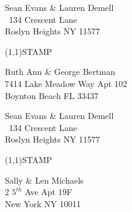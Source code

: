 \documentclass[12pt]{article}
\begin{document}
\begin{minipage}{.5\linewidth} \noindent
Sean Evans \& Lauren Demell\\\ 
134 Crescent Lane\\ 
Roslyn Heights NY 11577
\end{minipage}
\begin{minipage}{.5\linewidth \hspace{-.2in} \vspace{-.3in}}
\begin{flushright}
\framebox(1,1){STAMP}
\end{flushright}
\end{minipage}

\begin{center} \begin{Huge} \vspace*{\fill}
Ruth Ann \& George Bertman\\
7414 Lake Meadow Way Apt 102\\
Boynton Beach FL 33437\\
\vspace{\fill} \end{Huge} \end{center}

\clearpage

\begin{minipage}{.5\linewidth} \noindent
Sean Evans \& Lauren Demell\\\ 
134 Crescent Lane\\ 
Roslyn Heights NY 11577
\end{minipage}
\begin{minipage}{.5\linewidth \hspace{-.2in} \vspace{-.3in}}
\begin{flushright}
\framebox(1,1){STAMP}
\end{flushright}
\end{minipage}

\begin{center} \begin{Huge} \vspace*{\fill}
Sally \& Len Michaels\\
2 $5^{th}$ Ave Apt 19F\\
New York NY 10011\\
\vspace{\fill} \end{Huge} \end{center}

\clearpage
\end{document}
